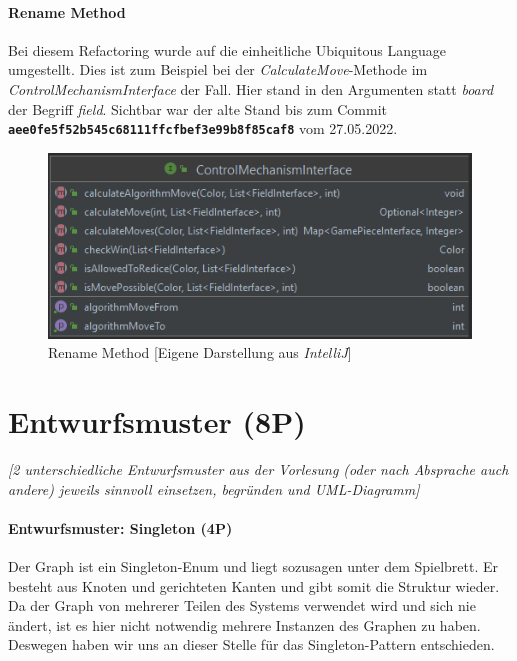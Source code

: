 \newpage
\subsubsection{Rename Method}
\noindent Bei diesem Refactoring wurde auf die einheitliche Ubiquitous Language umgestellt. Dies ist zum Beispiel bei der \emph{CalculateMove}-Methode im \emph{ControlMechanismInterface} der Fall. Hier stand in den Argumenten statt \emph{board} der Begriff \emph{field}. Sichtbar war der alte Stand bis zum Commit \textbf{\texttt{aee0fe5f52b545c68111ffcfbef3e99b8f85caf8}} vom 27.05.2022.

\begin{figure}[htbp]
\centering
\centerline{\includegraphics[scale=.6]{renamemethod}}
\caption{Rename Method [Eigene Darstellung aus \emph{IntelliJ}]}
\label{fig:renamemethod}
\end{figure}

\newpage
\titlespacing*{\chapter}{0pt}{-30mm}{10pt}
  
\chapter{Entwurfsmuster (8P)}
\pagestyle{scrheadings}
\clearscrheadfoot
{}
\setcounter{page}{35}
\ofoot[\pagemark]{\pagemark}
\onehalfspacing

\emph{[2 unterschiedliche Entwurfsmuster aus der Vorlesung (oder nach Absprache auch andere) jeweils
sinnvoll einsetzen, begründen und UML-Diagramm]}

\subsubsection{Entwurfsmuster: Singleton (4P)}
\noindent Der Graph ist ein Singleton-Enum und liegt sozusagen unter dem Spielbrett. Er besteht aus Knoten und gerichteten Kanten und gibt somit die Struktur wieder. Da der Graph von mehrerer Teilen des Systems verwendet wird und sich nie ändert, ist es hier nicht notwendig mehrere Instanzen des Graphen zu haben. Deswegen haben wir uns an dieser Stelle für das Singleton-Pattern entschieden.

